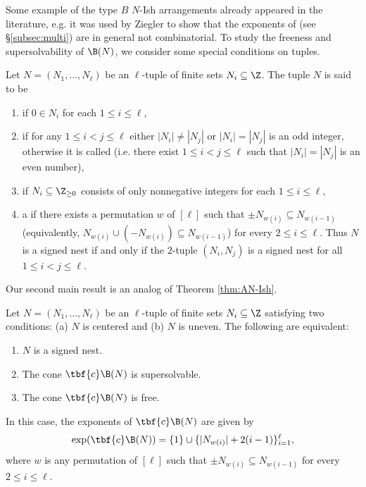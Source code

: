 Some example of the type $B$ $N$-Ish arrangements already appeared in the literature, e.g. it was used by Ziegler \cite[Proposition 10]{Z89} to show that the exponents of  (see \S\ref{subsec:multi}) are in general not combinatorial.
To study the freeness and supersolvability of  $\B(N)$, we consider some special conditions on tuples.
\begin{definition}
\label{def:N-cond}
Let $N = (N_1, \ldots, N_\ell)$ be an $\ell$-tuple of finite sets $N_i\subseteq\Z$. The tuple $N$ is said to be
 \begin{enumerate}[(1)]
\item  {} if $0 \in N_i$ for each $1 \le  i \leq \ell$, 
\item  {} if for any $1 \leq i < j \leq \ell$ either  $|N_i| \ne |N_j|$ or $|N_i| = |N_j|$ is an odd integer, otherwise it is  called  (i.e. there exist $1 \leq i < j \leq \ell$ such that $|N_i| = |N_j|$ is an even number), 
\item  {} if $N_i \subseteq \Z_{\ge0}$ consists of only nonnegative integers  for each $1 \le  i \leq \ell$, 
\item  a  if there exists a permutation $w$ of $[\ell]$ such that $\pm N_{w(i)} \subseteq N_{w(i-1)}$ (equivalently, $N_{w(i)} \cup (-N_{w(i)} )\subseteq N_{w(i-1)} $) for every $2 \le  i \leq \ell$. 
Thus $N$ is a signed nest if and only if the $2$-tuple $(N_i, N_j)$ is a signed nest  for all $1 \leq i < j \leq \ell$.
\end{enumerate}
\end{definition}

Our second main result is an analog of Theorem \ref{thm:AN-Ish}.

\begin{theorem}
 \label{thm:N-Ish-B-free-SS}
 Let $N = (N_1, \ldots, N_\ell)$ be  an $\ell$-tuple  of finite sets $N_i\subseteq \Z$ satisfying two conditions: (a)  $N$ is centered and (b) $N$ is uneven.
 The following are equivalent:
 \begin{enumerate}[(1)]
\item $N$ is a signed nest.
\item  The cone $\tbf{c}\B(N)$ is supersolvable.
\item The cone $\tbf{c}\B(N)$  is  free.
\end{enumerate}
In this case, the exponents of  $\tbf{c}\B(N)$ are given by 
$$\exp(\tbf{c}\B(N)) = \{1\} \cup \{| N_{w(i)}| + 2(i-1)\}_{i=1}^\ell,$$ 
where  $w$ is any permutation of $[\ell]$ such that $\pm N_{w(i)} \subseteq N_{w(i-1)}$ for every $2 \le  i \leq \ell$.
 \end{theorem}
 
